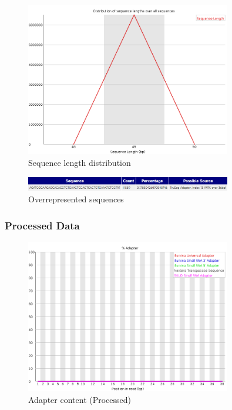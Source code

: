 \documentclass[UTF8]{ctexart}
\begin{document}
\begin{figure}[!htb]
	\centering
	\includegraphics[width=0.8\textwidth]{img/SRR14325859_FastQC_Origin_img/sequence_length_distribution.png}	
	\caption{Sequence length distribution\protect}    
\end{figure}

\begin{figure}[!htb]
	\centering
	\includegraphics[width=0.8\textwidth]{img/SRR14325859_FastQC_Origin_img/overrepresented_sequences.png}	
	\caption{Overrepresented sequences\protect}    
\end{figure}



\subsubsection{Processed Data}

\begin{figure}[!htb]
	\centering
	\includegraphics[width=0.8\textwidth]{img/SRR14325859_FastQC_Processed_img/adapter_content.png}	
	\caption{Adapter content (Processed)\protect}    
\end{figure}
\end{document}
